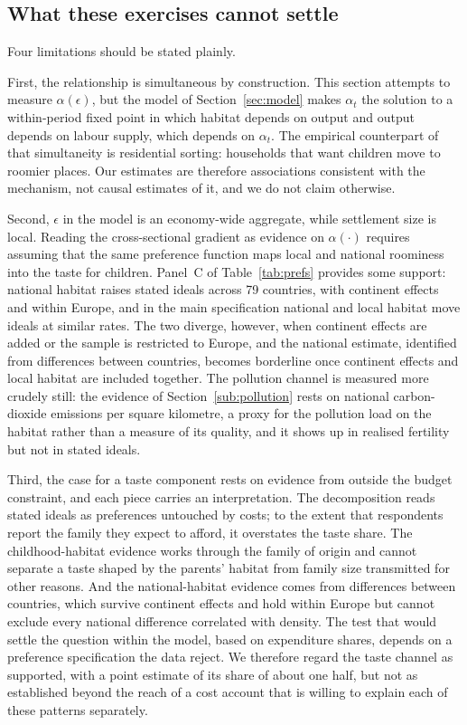 \documentclass[11pt]{article}
\begin{document}
\subsection{What these exercises cannot settle}
\label{sub:caveats}

Four limitations should be stated plainly.

First, the relationship is simultaneous by construction. This section attempts to
measure $\alpha(\epsilon)$, but the model of Section~\ref{sec:model} makes $\alpha_t$ the solution to a
within-period fixed point in which habitat depends on output and output depends on labour supply,
which depends on $\alpha_t$. The empirical counterpart of that simultaneity is residential sorting:
households that want children move to roomier places. Our estimates are therefore associations
consistent with the mechanism, not causal estimates of it, and we do not claim otherwise.

Second, $\epsilon$ in the model is an economy-wide aggregate, while settlement size is local.
Reading the cross-sectional gradient as evidence on $\alpha(\cdot)$ requires assuming that the same
preference function maps local and national roominess into the taste for children. Panel~C of
Table~\ref{tab:prefs} provides some support: national habitat raises stated ideals across 79
countries, with continent effects and within Europe, and in the main specification national and
local habitat move ideals at similar rates. The two diverge, however, when continent effects are
added or the sample is restricted to Europe, and the national estimate, identified from differences
between countries, becomes borderline once continent effects and local habitat are included
together. The pollution channel is measured more crudely still: the evidence of
Section~\ref{sub:pollution} rests on national carbon-dioxide emissions per square kilometre, a proxy for
the pollution load on the habitat rather than a measure of its quality, and it shows up in realised
fertility but not in stated ideals.

Third, the case for a taste component rests on evidence from outside the budget constraint, and
each piece carries an interpretation. The decomposition reads stated ideals as preferences
untouched by costs; to the extent that respondents report the family they expect to afford, it
overstates the taste share. The childhood-habitat evidence works through the family of origin and
cannot separate a taste shaped by the parents' habitat from family size transmitted for other
reasons. And the national-habitat evidence comes from differences between countries, which survive
continent effects and hold within Europe but cannot exclude every national difference correlated
with density. The test that would settle the question within the model, based
on expenditure shares, depends on a preference specification the data reject. We therefore regard
the taste channel as supported, with a point estimate of its share of about one half, but not as established beyond the
reach of a cost account that is willing to explain each of these patterns separately.
\end{document}
